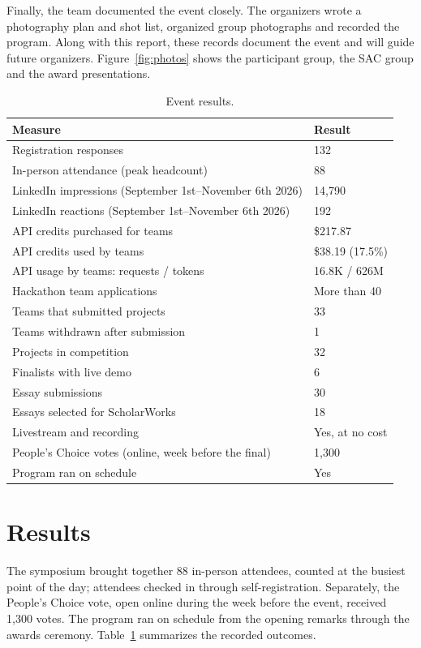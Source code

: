 \documentclass[sigconf,nonacm]{acmart}
\begin{document}
Finally, the team documented the event closely. The organizers wrote a photography plan and shot list, organized group photographs and recorded the program. Along with this report, these records document the event and will guide future organizers. Figure~\ref{fig:photos} shows the participant group, the SAC group and the award presentations.

\begin{table}[t]
  \caption{Event results.}
  \label{tab:kpi}
  \small
  \begin{tabularx}{\columnwidth}{@{}Xl@{}}
    \toprule
    \textbf{Measure} & \textbf{Result} \\
    \midrule
    Registration responses & 132 \\
    In-person attendance (peak headcount) & 88 \\
    LinkedIn impressions (September 1st--November 6th 2026) & 14,790 \\
    LinkedIn reactions (September 1st--November 6th 2026) & 192 \\
    API credits purchased for teams & \$217.87 \\
    API credits used by teams & \$38.19 (17.5\%) \\
    API usage by teams: requests / tokens & 16.8K / 626M \\
    Hackathon team applications & More than 40 \\
    Teams that submitted projects & 33 \\
    Teams withdrawn after submission & 1 \\
    Projects in competition & 32 \\
    Finalists with live demo & 6 \\
    Essay submissions & 30 \\
    Essays selected for ScholarWorks & 18 \\
    Livestream and recording & Yes, at no cost \\
    People's Choice votes (online, week before the final) & 1,300 \\
    Program ran on schedule & Yes \\
    \bottomrule
  \end{tabularx}
\end{table}

\section{Results}
The symposium brought together 88 in-person attendees, counted at the busiest point of the day; attendees checked in through self-registration. Separately, the People's Choice vote, open online during the week before the event, received 1,300 votes. The program ran on schedule from the opening remarks through the awards ceremony. Table~\ref{tab:kpi} summarizes the recorded outcomes.
\end{document}
